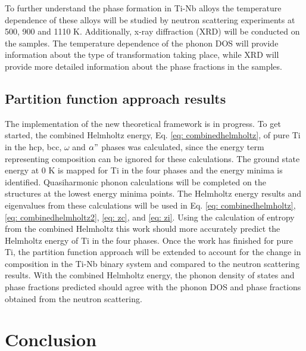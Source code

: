 To further understand the phase formation in Ti-Nb alloys the temperature dependence of these alloys will be studied by neutron scattering experiments at 500, 900 and 1110 K. Additionally, x-ray diffraction (XRD) will be conducted on the samples. The temperature dependence of the phonon DOS will provide information about the type of transformation taking place, while XRD will provide more detailed information about the phase fractions in the samples.

\subsection{Partition function approach results}

The implementation of the new theoretical framework is in progress. To get started, the combined Helmholtz energy, Eq. \ref{eq: combinedhelmholtz}, of pure Ti in the hcp, bcc, $\omega$ and $\alpha"$ phases was calculated, since the energy term representing composition can be ignored for these calculations. The ground state energy at 0 K is mapped for Ti in the four phases and the energy minima is identified. Quasiharmonic phonon calculations will be completed on the structures at the lowest energy minima points. The Helmholtz energy results and eigenvalues from these calculations will be used in Eq. \ref{eq: combinedhelmholtz}, \ref{eq: combinedhelmholtz2}, \ref{eq: zc}, and \ref{eq: zi}. Using the calculation of entropy from the combined Helmholtz this work should more accurately predict the Helmholtz energy of Ti in the four phases. Once the work has finished for pure Ti, the partition function approach will be extended to account for the change in composition in the Ti-Nb binary system and compared to the neutron scattering results. With the combined Helmholtz energy, the phonon density of states and phase fractions predicted should agree with the phonon DOS and phase fractions obtained from the neutron scattering.

\section{Conclusion}

